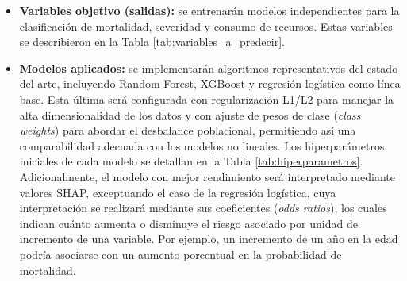 \begin{itemize}
\item \textbf{Variables objetivo (salidas):} se entrenarán modelos independientes para la clasificación de mortalidad, severidad y consumo de recursos. Estas variables se describieron en la Tabla \ref{tab:variables_a_predecir}.

\item \textbf{Modelos aplicados:} se implementarán algoritmos representativos del estado del arte, incluyendo Random Forest, XGBoost y regresión logística como línea base. Esta última será configurada con regularización L1/L2 para manejar la alta dimensionalidad de los datos y con ajuste de pesos de clase (\textit{class weights}) para abordar el desbalance poblacional, permitiendo así una comparabilidad adecuada con los modelos no lineales. Los hiperparámetros iniciales de cada modelo se detallan en la Tabla \ref{tab:hiperparametros}. Adicionalmente, el modelo con mejor rendimiento será interpretado mediante valores SHAP, exceptuando el caso de la regresión logística, cuya interpretación se realizará mediante sus coeficientes (\textit{odds ratios}), los cuales indican cuánto aumenta o disminuye el riesgo asociado por unidad de incremento de una variable. Por ejemplo, un incremento de un año en la edad podría asociarse con un aumento porcentual en la probabilidad de mortalidad.

\end{itemize}

